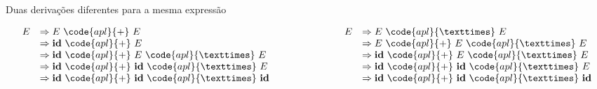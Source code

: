 \begin{frame}[fragile]{Duas derivações diferentes para a mesma expressão}

\[
    \begin{array}{rlp{2cm}rl}
        E & \Rightarrow E\ \code{apl}{+}\ E & & E & \Rightarrow E\ \code{apl}{×}\ E \\
        & \Rightarrow \textbf{id}\ \code{apl}{+}\ E & & & \Rightarrow E\ \code{apl}{+}\ E\ \code{apl}{×}\ E \\
        & \Rightarrow \textbf{id}\ \code{apl}{+}\ E\ \code{apl}{×}\ E & & & \Rightarrow \textbf{id}\ \code{apl}{+}\ E\ \code{apl}{×}\ E \\
        & \Rightarrow \textbf{id}\ \code{apl}{+}\ \textbf{id}\ \code{apl}{×}\ E & & & \Rightarrow \textbf{id}\ \code{apl}{+}\ \textbf{id}\ \code{apl}{×}\ E \\
        & \Rightarrow \textbf{id}\ \code{apl}{+}\ \textbf{id}\ \code{apl}{×}\ \textbf{id} & & & \Rightarrow \textbf{id}\ \code{apl}{+}\ \textbf{id}\ \code{apl}{×}\ \textbf{id} \\
    \end{array}
\]

\end{frame}

